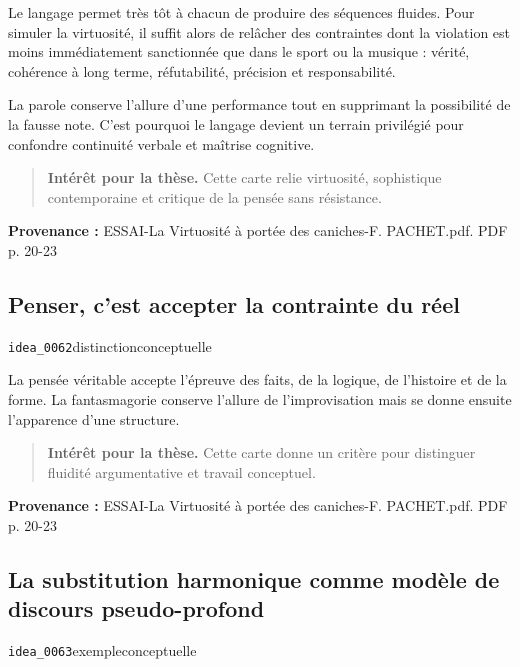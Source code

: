 \documentclass[10pt,a4paper]{article}
\begin{document}
Le langage permet très tôt à chacun de produire des séquences fluides. Pour simuler la virtuosité, il suffit alors de relâcher des contraintes dont la violation est moins immédiatement sanctionnée que dans le sport ou la musique : vérité, cohérence à long terme, réfutabilité, précision et responsabilité.

La parole conserve l'allure d'une performance tout en supprimant la possibilité de la fausse note. C'est pourquoi le langage devient un terrain privilégié pour confondre continuité verbale et maîtrise cognitive.

\begin{quote}
\textbf{Intérêt pour la thèse.} Cette carte relie virtuosité, sophistique contemporaine et critique de la pensée sans résistance.
\end{quote}
{\footnotesize\color{metadata}\textbf{Provenance :} ESSAI-La Virtuosité à portée des caniches-F. PACHET.pdf. PDF p. 20-23\par}

\subsection{Penser, c'est accepter la contrainte du réel}
{\small\color{metadata} \texttt{idea\_0062}\quad\textbullet\quad distinction\quad\textbullet\quad conceptuelle\par}

La pensée véritable accepte l'épreuve des faits, de la logique, de l'histoire et de la forme. La fantasmagorie conserve l'allure de l'improvisation mais se donne ensuite l'apparence d'une structure.

\begin{quote}
\textbf{Intérêt pour la thèse.} Cette carte donne un critère pour distinguer fluidité argumentative et travail conceptuel.
\end{quote}
{\footnotesize\color{metadata}\textbf{Provenance :} ESSAI-La Virtuosité à portée des caniches-F. PACHET.pdf. PDF p. 20-23\par}

\subsection{La substitution harmonique comme modèle de discours pseudo-profond}
{\small\color{metadata} \texttt{idea\_0063}\quad\textbullet\quad exemple\quad\textbullet\quad conceptuelle\par}
\end{document}
